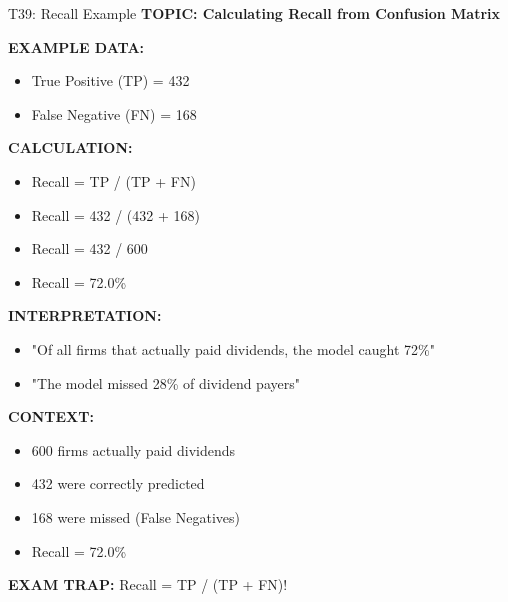 \documentclass[8pt]{beamer}
\begin{document}
	\begin{frame}{T39: Recall Example}
		\fontsize{6.5}{7.5}\selectfont
		\textbf{TOPIC: Calculating Recall from Confusion Matrix}
		
		\vspace{0.1cm}
		\textbf{EXAMPLE DATA:}
		\begin{itemize}
			\item True Positive (TP) = 432
			\item False Negative (FN) = 168
		\end{itemize}
		
		\vspace{0.1cm}
		\textbf{CALCULATION:}
		\begin{itemize}
			\item Recall = TP / (TP + FN)
			\item Recall = 432 / (432 + 168)
			\item Recall = 432 / 600
			\item Recall = 72.0\%
		\end{itemize}
		
		\vspace{0.1cm}
		\textbf{INTERPRETATION:}
		\begin{itemize}
			\item "Of all firms that actually paid dividends, the model caught 72\%"
			\item "The model missed 28\% of dividend payers"
		\end{itemize}
		
		\vspace{0.1cm}
		\textbf{CONTEXT:}
		\begin{itemize}
			\item 600 firms actually paid dividends
			\item 432 were correctly predicted
			\item 168 were missed (False Negatives)
			\item Recall = 72.0\%
		\end{itemize}
		
		\textcolor{myred}{\textbf{EXAM TRAP:}} Recall = \textcolor{myblue}{TP / (TP + FN)}!
	\end{frame}
	
\end{document}
